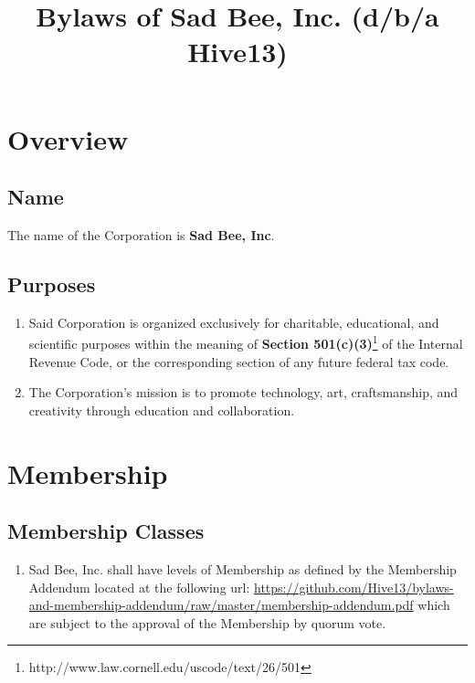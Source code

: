 \documentclass{article}
\title{Bylaws of Sad Bee, Inc. (d/b/a Hive13)}
\begin{document}
\maketitle
\section{Overview}
\subsection{Name}
The name of the Corporation is \textbf{Sad Bee, Inc}.
\subsection{Purposes}
\begin{enumerate}
	\item Said Corporation is organized exclusively for charitable, educational, and scientific purposes within the meaning of \textbf{Section 501(c)(3)}\footnote{http://www.law.cornell.edu/uscode/text/26/501} of the Internal Revenue Code, or the corresponding section of any future federal tax code.
	\item The Corporation’s mission is to promote technology, art, craftsmanship, and creativity through education and collaboration.
\end{enumerate}
\section{Membership}
\subsection{Membership Classes}
\begin{enumerate}
    \item Sad Bee, Inc. shall have levels of Membership as defined by the
      Membership Addendum located at the following url: \url{https://github.com/Hive13/bylaws-and-membership-addendum/raw/master/membership-addendum.pdf} which are
    subject to the approval of the Membership by quorum vote.
\end{enumerate}
\end{document}

